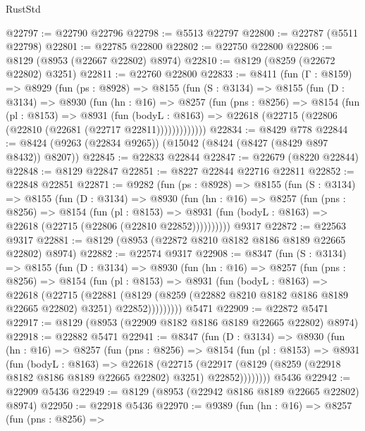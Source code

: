 \begin{lexlean}{RustStd}
\begin{coremodule}
@22797 := @22790 @22796
@22798 := @5513 @22797
@22800 := @22787 (@5511 @22798)
@22801 := @22785 @22800
@22802 := @22750 @22800
@22806 := @8129 (@8953 (@22667 @22802) @8974)
@22810 := @8129 (@8259 (@22672 @22802) @3251)
@22811 := @22760 @22800
@22833 := @8411
    (fun (Γ : @8159) =>
    @8929
      (fun (ps : @8928) =>
      @8155
        (fun (S : @3134) =>
        @8155
          (fun (D : @3134) =>
          @8930
            (fun (hn : @16) =>
            @8257
              (fun (pns : @8256) =>
              @8154
                (fun (pl : @8153) =>
                @8931
                  (fun (bodyL : @8163) =>
                  @22618 (@22715 (@22806 (@22810 (@22681 (@22717 @22811)))))))))))))
@22834 := @8429 @778
@22844 := @8424 (@9263 (@22834 @9265)) (@15042 (@8424 (@8427 (@8429 @897 @8432)) @8207))
@22845 := @22833 @22844
@22847 := @22679 (@8220 @22844)
@22848 := @8129 @22847
@22851 := @8227 @22844 @22716 @22811
@22852 := @22848 @22851
@22871 := @9282
    (fun (ps : @8928) =>
    @8155
      (fun (S : @3134) =>
      @8155
        (fun (D : @3134) =>
        @8930
          (fun (hn : @16) =>
          @8257
            (fun (pns : @8256) =>
            @8154
              (fun (pl : @8153) =>
              @8931 (fun (bodyL : @8163) => @22618 (@22715 (@22806 (@22810 @22852))))))))))
    @9317
@22872 := @22563 @9317
@22881 := @8129 (@8953 (@22872 @8210 @8182 @8186 @8189 @22665 @22802) @8974)
@22882 := @22574 @9317
@22908 := @8347
    (fun (S : @3134) =>
    @8155
      (fun (D : @3134) =>
      @8930
        (fun (hn : @16) =>
        @8257
          (fun (pns : @8256) =>
          @8154
            (fun (pl : @8153) =>
            @8931
              (fun (bodyL : @8163) =>
              @22618
                (@22715
                  (@22881
                    (@8129
                      (@8259 (@22882 @8210 @8182 @8186 @8189 @22665 @22802) @3251)
                      @22852)))))))))
    @5471
@22909 := @22872 @5471
@22917 := @8129 (@8953 (@22909 @8182 @8186 @8189 @22665 @22802) @8974)
@22918 := @22882 @5471
@22941 := @8347
    (fun (D : @3134) =>
    @8930
      (fun (hn : @16) =>
      @8257
        (fun (pns : @8256) =>
        @8154
          (fun (pl : @8153) =>
          @8931
            (fun (bodyL : @8163) =>
            @22618
              (@22715
                (@22917 (@8129 (@8259 (@22918 @8182 @8186 @8189 @22665 @22802) @3251) @22852))))))))
    @5436
@22942 := @22909 @5436
@22949 := @8129 (@8953 (@22942 @8186 @8189 @22665 @22802) @8974)
@22950 := @22918 @5436
@22970 := @9389
    (fun (hn : @16) =>
    @8257
      (fun (pns : @8256) =>

\end{coremodule}
\end{lexlean}
